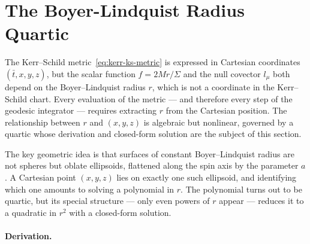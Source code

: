 \section{The Boyer-Lindquist Radius Quartic}
\label{sec:kerr-bl-quartic}

The Kerr--Schild metric~\cref{eq:kerr-ks-metric} is expressed in
Cartesian coordinates $(\bar{t}, x, y, z)$, but the scalar function
$f = 2Mr/\Sigma$ and the null covector $l_\mu$ both depend on the
Boyer--Lindquist radius $r$, which is not a coordinate in the
Kerr--Schild chart.  Every evaluation of the metric --- and therefore
every step of the geodesic integrator --- requires extracting $r$
from the Cartesian position.  The relationship between $r$ and
$(x, y, z)$ is algebraic but nonlinear, governed by a quartic whose
derivation and closed-form solution are the subject of this section.

The key geometric idea is that surfaces of constant Boyer--Lindquist
radius are not spheres but oblate ellipsoids, flattened along the
spin axis by the parameter $a$.  A Cartesian point $(x, y, z)$ lies
on exactly one such ellipsoid, and identifying which one amounts to
solving a polynomial in $r$.  The polynomial turns out to be quartic,
but its special structure --- only even powers of $r$ appear ---
reduces it to a quadratic in $r^2$ with a closed-form solution.

\paragraph{Derivation.}

